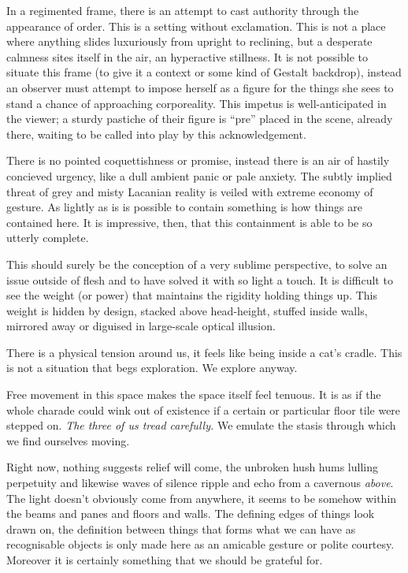 \documentclass{book}
\begin{document}
In a regimented frame, there is an attempt to cast authority through the
appearance of order. This is a setting without exclamation. This is not a place
where anything slides luxuriously from upright to reclining, but a desperate
calmness sites itself in the air, an hyperactive stillness. It is not possible
to situate this frame (to give it a context or some kind of Gestalt backdrop),
instead an observer must attempt to impose herself as a figure for the things
she sees to stand a chance of approaching corporeality. This impetus is
well-anticipated in the viewer; a sturdy pastiche of their figure is ``pre''
placed in the scene, already there, waiting to be called into play by this
acknowledgement.

There is no pointed coquettishness or promise, instead there is an air of
hastily concieved urgency, like a dull ambient panic or pale anxiety. The
subtly implied threat of grey and misty Lacanian reality is veiled with extreme
economy of gesture. As lightly as is is possible to contain something is how
things are contained here. It is impressive, then, that this containment is
able to be so utterly complete.

This should surely be the conception of a very sublime perspective, to solve an
issue outside of flesh and to have solved it with so light a touch. It is
difficult to see the weight (or power) that maintains the rigidity holding
things up.  This weight is hidden by design, stacked above head-height, stuffed
inside walls, mirrored away or diguised in large-scale optical illusion.

There is a physical tension around us, it feels like being inside a cat's
cradle. This is not a situation that begs exploration. We explore anyway.

Free movement in this space makes the space itself feel tenuous. It is as if
the whole charade could wink out of existence if a certain or particular floor
tile were stepped on.  \emph{The three of us tread carefully.} We emulate the
stasis through which we find ourselves moving.

Right now, nothing suggests relief will come, the unbroken hush hums lulling
perpetuity and likewise waves of silence ripple and echo from a cavernous
\emph{above}.  The light doesn't obviously come from anywhere, it seems to be
somehow within the beams and panes and floors and walls. The defining edges of
things look drawn on, the definition between things that forms what we can have
as recognisable objects is only made here as an amicable gesture or polite
courtesy. Moreover it is certainly something that we should be grateful for.
\end{document}
